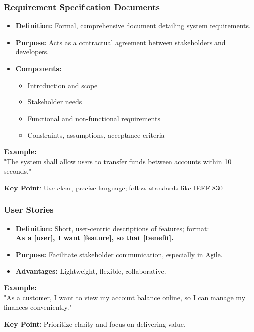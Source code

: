 \documentclass{beamer}
\begin{document}
\begin{frame}[fragile]
    \frametitle{Requirement Specification Documents}
    \begin{itemize}
        \item \textbf{Definition:} Formal, comprehensive document detailing system requirements.
        \item \textbf{Purpose:} Acts as a contractual agreement between stakeholders and developers.
        \item \textbf{Components:}
        \begin{itemize}
            \item Introduction and scope
            \item Stakeholder needs
            \item Functional and non-functional requirements
            \item Constraints, assumptions, acceptance criteria
        \end{itemize}
    \end{itemize}
    \vspace{1em}
    \textbf{Example:} \\
    "The system shall allow users to transfer funds between accounts within 10 seconds."
    
    \vspace{0.5em}
    \textbf{Key Point:} Use clear, precise language; follow standards like IEEE 830.
\end{frame}

\begin{frame}[fragile]
    \frametitle{User Stories}
    \begin{itemize}
        \item \textbf{Definition:} Short, user-centric descriptions of features; format: \\
        \textbf{As a [user], I want [feature], so that [benefit].}
        \item \textbf{Purpose:} Facilitate stakeholder communication, especially in Agile.
        \item \textbf{Advantages:} Lightweight, flexible, collaborative.
    \end{itemize}
    \vspace{1em}
    \textbf{Example:} \\
    "As a customer, I want to view my account balance online, so I can manage my finances conveniently."
    
    \vspace{0.5em}
    \textbf{Key Point:} Prioritize clarity and focus on delivering value.
\end{frame}
\end{document}
